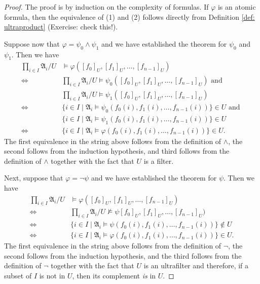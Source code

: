\documentclass[a4paper]{memoir}
\theoremstyle{definition}
\begin{document}
\begin{proof}
  The proof is by induction on the complexity of formulas. If $\varphi$ is an atomic formula, 
  then the equivalence of (1) and (2) follows directly from Definition \ref{def: ultraproduct} 
  (Exercise: check this!).
  
  Suppose now that $\varphi = \psi_0 \wedge \psi_1$ and we have established the theorem for 
  $\psi_0$ and $\psi_1$. Then we have 
  \begin{align*}
    \prod_{i \in I} \mathfrak{A}_i/U & \models \varphi([f_0]_U, [f_1]_U, \ldots, [f_{n-1}]_U) \\ 
     \Longleftrightarrow &  \prod_{i \in I} \mathfrak{A}_i/U \models \psi_0([f_0]_U, [f_1]_U, \ldots, [f_{n-1}]_U) \text{ and } \\ 
     &  \prod_{i \in I} \mathfrak{A}_i/U \models \psi_1([f_0]_U, [f_1]_U, \ldots, [f_{n-1}]_U) \\ 
     \Longleftrightarrow & \{i \in I \mid \mathfrak{A}_i \models \psi_0(f_0(i), f_1(i), \ldots, f_{n-1}(i))\} \in U \text{ and } \\
     & \{i \in I \mid \mathfrak{A}_i \models \psi_1(f_0(i), f_1(i), \ldots, f_{n-1}(i))\} \in U \\ 
     \Longleftrightarrow & \{i \in I \mid \mathfrak{A}_i \models \varphi(f_0(i), f_1(i), \ldots, f_{n-1}(i))\} \in U.
  \end{align*}
  The first equivalence in the string above follows from the definition of $\wedge$, the second 
  follows from the induction hypothesis, and third follows from the definition of $\wedge$ together 
  with the fact that $U$ is a filter.
  
  Next, suppose that $\varphi = \neg \psi$ and we have established the theorem for $\psi$. Then 
  we have 
  \begin{align*}
    \prod_{i \in I} \mathfrak{A}_i/U & \models \varphi([f_0]_U, [f_1]_U, \ldots, [f_{n-1}]_U) \\ 
     \Longleftrightarrow & \prod_{i \in I} \mathfrak{A}_i/U \not\models \psi[f_0]_U, [f_1]_U, \ldots, [f_{n-1}]_U) \\
     \Longleftrightarrow & \{i \in I \mid \mathfrak{A}_i \models \psi(f_0(i), f_1(i), \ldots, 
     f_{n-1}(i))\} \notin U \\ 
     \Longleftrightarrow & \{i \in I \mid \mathfrak{A}_i \models \varphi(f_0(i), f_1(i), \ldots, 
     f_{n-1}(i))\} \in U.
  \end{align*}
  The first equivalence in the string above follows from the definition of $\neg$, the second 
  follows from the induction hypothesis, and the third follows from the definition of $\neg$ together 
  with the fact that $U$ is an ultrafilter and therefore, if a subset of $I$ is not in $U$, then 
  its complement \emph{is} in $U$.
  

\end{proof}
\end{document}
